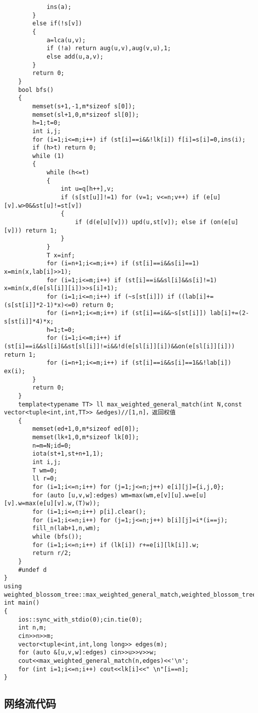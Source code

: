 \documentclass[12pt]{ctexart}
\begin{document}
\begin{lstlisting}
			ins(a);
		}
		else if(!s[v])
		{
			a=lca(u,v);
			if (!a) return aug(u,v),aug(v,u),1;
			else add(u,a,v);
		}
		return 0;
	}
	bool bfs()
	{
		memset(s+1,-1,m*sizeof s[0]);
		memset(sl+1,0,m*sizeof sl[0]);
		h=1;t=0;
		int i,j;
		for (i=1;i<=m;i++) if (st[i]==i&&!lk[i]) f[i]=s[i]=0,ins(i);
		if (h>t) return 0;
		while (1)
		{
			while (h<=t)
			{
				int u=q[h++],v;
				if (s[st[u]]!=1) for (v=1; v<=n;v++) if (e[u][v].w>0&&st[u]!=st[v])
				{
					if (d(e[u][v])) upd(u,st[v]); else if (on(e[u][v])) return 1;
				}
			}
			T x=inf;
			for (i=n+1;i<=m;i++) if (st[i]==i&&s[i]==1) x=min(x,lab[i]>>1);
			for (i=1;i<=m;i++) if (st[i]==i&&sl[i]&&s[i]!=1) x=min(x,d(e[sl[i]][i])>>s[i]+1);
			for (i=1;i<=n;i++) if (~s[st[i]]) if ((lab[i]+=(s[st[i]]*2-1)*x)<=0) return 0;
			for (i=n+1;i<=m;i++) if (st[i]==i&&~s[st[i]]) lab[i]+=(2-s[st[i]]*4)*x;
			h=1;t=0;
			for (i=1;i<=m;i++) if (st[i]==i&&sl[i]&&st[sl[i]]!=i&&!d(e[sl[i]][i])&&on(e[sl[i]][i])) return 1;
			for (i=n+1;i<=m;i++) if (st[i]==i&&s[i]==1&&!lab[i]) ex(i);
		}
		return 0;
	}
	template<typename TT> ll max_weighted_general_match(int N,const vector<tuple<int,int,TT>> &edges)//[1,n]，返回权值
	{
		memset(ed+1,0,m*sizeof ed[0]);
		memset(lk+1,0,m*sizeof lk[0]);
		n=m=N;id=0;
		iota(st+1,st+n+1,1);
		int i,j;
		T wm=0;
		ll r=0;
		for (i=1;i<=n;i++) for (j=1;j<=n;j++) e[i][j]={i,j,0};
		for (auto [u,v,w]:edges) wm=max(wm,e[v][u].w=e[u][v].w=max(e[u][v].w,(T)w));
		for (i=1;i<=n;i++) p[i].clear();
		for (i=1;i<=n;i++) for (j=1;j<=n;j++) b[i][j]=i*(i==j);
		fill_n(lab+1,n,wm);
		while (bfs());
		for (i=1;i<=n;i++) if (lk[i]) r+=e[i][lk[i]].w;
		return r/2;
	}
	#undef d
}
using weighted_blossom_tree::max_weighted_general_match,weighted_blossom_tree::lk;
int main()
{
	ios::sync_with_stdio(0);cin.tie(0);
	int n,m;
	cin>>n>>m;
	vector<tuple<int,int,long long>> edges(m);
	for (auto &[u,v,w]:edges) cin>>u>>v>>w;
	cout<<max_weighted_general_match(n,edges)<<'\n';
	for (int i=1;i<=n;i++) cout<<lk[i]<<" \n"[i==n];
}
\end{lstlisting}

\subsection{网络流代码}
\end{document}
